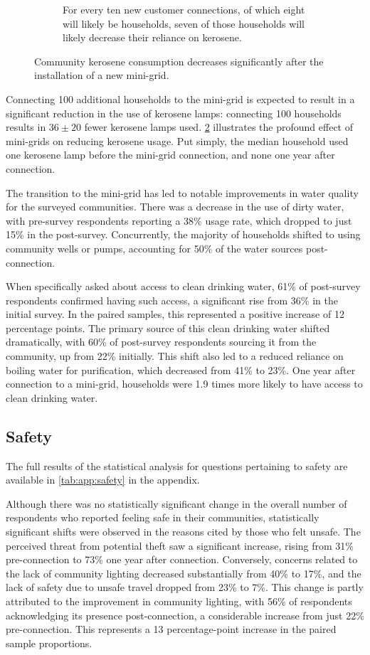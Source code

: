 \begin{figure}[th]
\begin{subfigure}[t]{0.48\textwidth}
        \caption{For every ten new customer connections, of which eight will likely be households, seven of those households will likely decrease their reliance on kerosene.}
        \label{fig:regression-kerosene}
    \end{subfigure}
    \caption{Community kerosene consumption decreases significantly after the installation of a new mini-grid.}
    \label{fig:kerosene}
\end{figure}
Connecting 100 additional households to the mini-grid is expected to result in a significant reduction in the use of kerosene lamps: connecting 100 households results in $36\pm20$ fewer kerosene lamps used. \cref{fig:kerosene} illustrates the profound effect of mini-grids on reducing kerosene usage. Put simply, the median household used one kerosene lamp before the mini-grid connection, and none one year after connection.

The transition to the mini-grid has led to notable improvements in water quality for the surveyed communities. There was a decrease in the use of dirty water, with pre-survey respondents reporting a 38\% usage rate, which dropped to just 15\% in the post-survey. Concurrently, the majority of households shifted to using community wells or pumps, accounting for 50\% of the water sources post-connection.

When specifically asked about access to clean drinking water, 61\% of post-survey respondents confirmed having such access, a significant rise from 36\% in the initial survey. In the paired samples, this represented a positive increase of 12 percentage points. The primary source of this clean drinking water shifted dramatically, with 60\% of post-survey respondents sourcing it from the community, up from 22\% initially. This shift also led to a reduced reliance on boiling water for purification, which decreased from 41\% to 23\%. One year after connection to a mini-grid, households were 1.9 times more likely to have access to clean drinking water.

\subsection{Safety}
The full results of the statistical analysis for questions pertaining to safety are available in \cref{tab:app:safety} in the appendix.

Although there was no statistically significant change in the overall number of respondents who reported feeling safe in their communities, statistically significant shifts were observed in the reasons cited by those who felt unsafe. The perceived threat from potential theft saw a significant increase, rising from 31\% pre-connection to 73\% one year after connection. Conversely, concerns related to the lack of community lighting decreased substantially from 40\% to 17\%, and the lack of safety due to unsafe travel dropped from 23\% to 7\%. This change is partly attributed to the improvement in community lighting, with 56\% of respondents acknowledging its presence post-connection, a considerable increase from just 22\% pre-connection. This represents a 13 percentage-point increase in the paired sample proportions.

